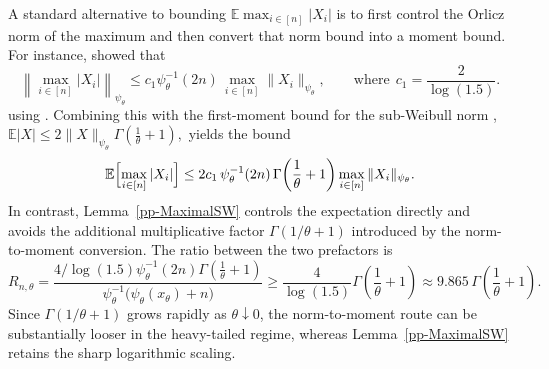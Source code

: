 \documentclass[11pt]{article}
\begin{document}
A standard alternative to bounding $\mathbb{E}\max_{i\in [n]} |X_i|$ is to
first control the Orlicz norm of the maximum and then convert that norm bound
into a moment bound. For instance, \citet[(S2.2)]{mendes2023concentration}
showed that
\[
\left\|\max_{i\in [n]}|X_i|\right\|_{\psi_\theta}
\le c_1 \psi_\theta^{-1}(2n)\,\max_{i\in [n]}\|X_i\|_{\psi_\theta},
\qquad\text{where}~~c_1=\frac{2}{\log(1.5)}.
\]
using \cite[Lemma~2.2.2]{Aad2023}. Combining this with the first-moment bound
for the sub-Weibull norm \cite[Corollary~3]{zhang2022sharper},
$
\mathbb{E}|X|\le 2\|X\|_{\psi_\theta}\Gamma\!\left(\frac{1}{\theta}+1\right),
$
yields the bound
\[
\mathbb{E}\Bigl[\max_{i\in [n]} |X_i|\Bigr]
\le 2c_1\,\psi_\theta^{-1}(2n)\,\Gamma\!\left(\frac{1}{\theta}+1\right)
\max_{i\in [n]}\|X_i\|_{\psi_\theta}.
\]
In contrast, Lemma~\ref{pp-MaximalSW} controls the expectation directly and
avoids the additional multiplicative factor
$\Gamma(1/\theta+1)$ introduced by the norm-to-moment conversion. The ratio
between the two prefactors is
\begin{equation}\label{eq:sharplow}
    R_{n,\theta}=\frac{4/ \log (1.5) \psi_\theta^{-1}(2 n)\Gamma\!\left(\frac{1}{\theta}+1\right)}{\psi_\theta^{-1}\bigl(\psi_\theta(x_\theta)+n\bigr)
}\ge \frac{4}{\log(1.5)} \Gamma\left(\frac{1}{\theta} + 1\right) \approx 9.865 \, \Gamma\left(\frac{1}{\theta} + 1\right).
\end{equation}
Since $\Gamma(1/\theta+1)$ grows rapidly as $\theta\downarrow 0$, the
norm-to-moment route can be substantially looser in the heavy-tailed regime,
whereas Lemma~\ref{pp-MaximalSW} retains the sharp logarithmic scaling.
\end{document}
